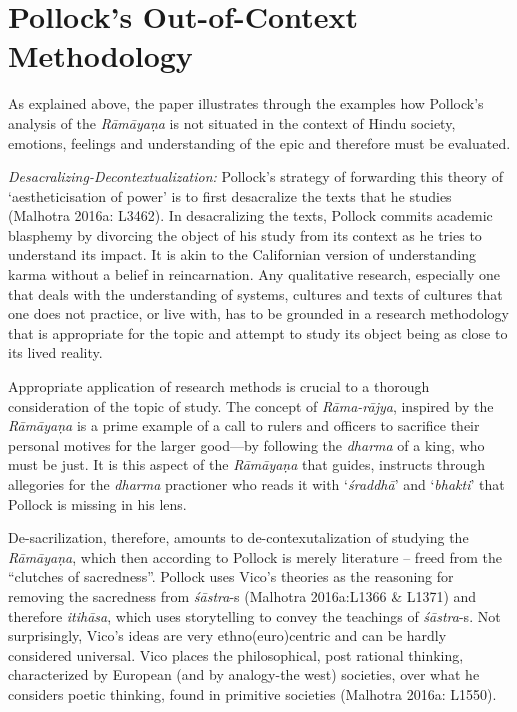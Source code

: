 \section*{Pollock’s Out-of-Context Methodology}

As explained above, the paper illustrates through the examples how Pollock’s analysis of the \textit{Rāmāyaṇa} is not situated in the context of Hindu society, emotions, feelings and understanding of the epic and therefore must be evaluated.

\textit{Desacralizing-Decontextualization:} Pollock’s strategy of forwarding this theory of ‘aestheticisation of power’ is to first desacralize the texts that he studies (Malhotra 2016a: L3462). In desacralizing the texts, Pollock commits academic blasphemy by divorcing the object of his study from its context as he tries to understand its impact. It is akin to the Californian version of understanding karma without a belief in reincarnation. Any qualitative research, especially one that deals with the understanding of systems, cultures and texts of cultures that one does not practice, or live with, has to be grounded in a research methodology that is appropriate for the topic and attempt to study its object being as close to its lived reality.

Appropriate application of research methods is crucial to a thorough consideration of the topic of study. The concept of \textit{Rāma-rājya}, inspired by the \textit{Rāmāyaṇa} is a prime example of a call to rulers and officers to sacrifice their personal motives for the larger good—by following the \textit{dharma} of a king, who must be just. It is this aspect of the \textit{Rāmāyaṇa} that guides, instructs through allegories for the \textit{dharma} practioner who reads it with ‘\textit{śraddhā}’ and ‘\textit{bhakti}’ that Pollock is missing in his lens.

De-sacrilization, therefore, amounts to de-contexutalization of studying the \textit{Rāmāyaṇa}, which then according to Pollock is merely literature – freed from the “clutches of sacredness”. Pollock uses Vico’s theories as the reasoning for removing the sacredness from \textit{śāstra}-s (Malhotra 2016a:L1366 \& L1371) and therefore \textit{itihāsa}, which uses storytelling to convey the teachings of \textit{śāstra}-s. Not surprisingly, Vico’s ideas are very ethno(euro)centric and can be hardly considered universal. Vico places the philosophical, post rational thinking, characterized by European (and by analogy-the west) societies, over what he considers poetic thinking, found in primitive societies (Malhotra 2016a: L1550).

